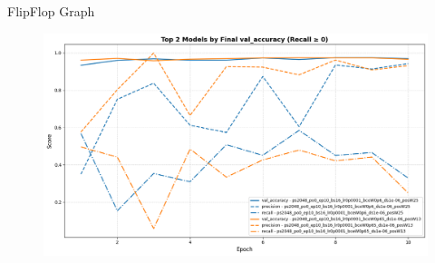\documentclass{beamer}
\begin{document}
\begin{frame}{FlipFlop Graph}
    \begin{figure}
        \centering
        \includegraphics[height=0.7\textheight]{Images/Exp3_acc_prec_rec.png}
    \end{figure}
\end{frame}
\end{document}
